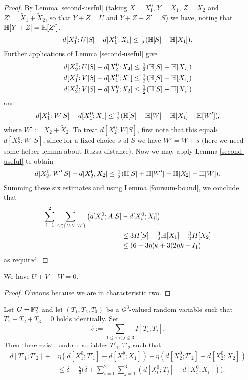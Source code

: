 \begin{proof}
  By Lemma \ref{second-useful} (taking $X = X_1^0$, $Y = X_1$, $Z = X_2$ and $Z' = \tilde X_1 + \tilde X_2$, so that $Y + Z = U$ and $Y + Z + Z' = S$) we have, noting that $\mathbb{H}[Y+Z] = \mathbb{H}[Z']$,
  \[
    d[X^0_1;U|S] - d[X^0_1;X_1] \leq \tfrac{1}{2} (\mathbb{H}[S] -  \mathbb{H}[X_1]).
  \]
  Further applications of Lemma \ref{second-useful} give
  \begin{align*}
  d[X^0_2;U|S] - d[X^0_2; X_2] &\leq \tfrac{1}{2} (\mathbb{H}[S] -  \mathbb{H}[X_2]) \\
  d[X^0_1;V|S] - d[X^0_1;X_1] &\leq \tfrac{1}{2} (\mathbb{H}[S] -  \mathbb{H}[X_1])\\
  d[X^0_2;V|S] - d[X^0_2;X_2] &\leq \tfrac{1}{2} (\mathbb{H}[S] -  \mathbb{H}[X_2])
  \end{align*}
  and
  \[ d[X^0_1;W|S] - d[X^0_1;X_1] \leq \tfrac{1}{2} (\mathbb{H}[S] + \mathbb{H}[W] - \mathbb{H}[X_1] - \mathbb{H}[W']),\] where $W' := X_2 + \tilde X_2$.
  To treat $d[X^0_2;W|S]$, first note that this equals $d[X^0_2;W'|S]$, since for a fixed choice $s$ of $S$ we have $W' = W + s$ (here we need some helper lemma about Ruzsa distance). Now we may apply Lemma \ref{second-useful} to obtain
  \[ d[X^0_2;W'|S] - d[X^0_2;X_2] \leq \tfrac{1}{2} (\mathbb{H}[S] + \mathbb{H}[W'] - \mathbb{H}[X_2] - \mathbb{H}[W]).\]
  Summing these six estimates and using Lemma \ref{foursum-bound}, we conclude that
  \begin{align*}
    \sum_{i=1}^2 \sum_{A\in\{U,V,W\}} \big(d[X^0_i;A|S] & - d[X^0_i;X_i]\big) \\
      &\leq 3H[S] - \tfrac{3}{2} \mathbb{H}[X_1] - \tfrac{3}{2}H[X_2]\\
      &\leq (6 - 3\eta) k + 3(2 \eta k - I_1)
  \end{align*}
  as required.
\end{proof}

\begin{lemma}\label{key-ident}
\leanok
We have $U+V+W=0$.
\end{lemma}

\begin{proof} \leanok Obvious because we are in characteristic two.
\end{proof}

\begin{lemma}\label{construct-good}
  \leanok
  Let $G=\mathbb{F}_2^n$ and let $(T_1,T_2,T_3)$ be a $G^3$-valued random variable such that $T_1+T_2+T_3=0$ holds identically. Set
  \begin{equation}\label{delta-t1t2t3-def}
    \delta := \sum_{1 \leq i < j \leq 3} I[T_i;T_j].
  \end{equation}
  Then there exist random variables $T'_1, T'_2$ such that
  \begin{align*}  d[T'_1;T'_2] + & \eta (d[X_1^0;T'_1] - d[X_1^0;X_1]) + \eta(d[X_2^0;T'_2] - d[X_2^0;X_2]) \\ & \leq  \delta + \frac{\eta}{3} \biggl( \delta + \sum_{i=1}^2 \sum_{j = 1}^3 (d[X^0_i;T_j] - d[X^0_i; X_i]) \biggr).
  \end{align*}
\end{lemma}


